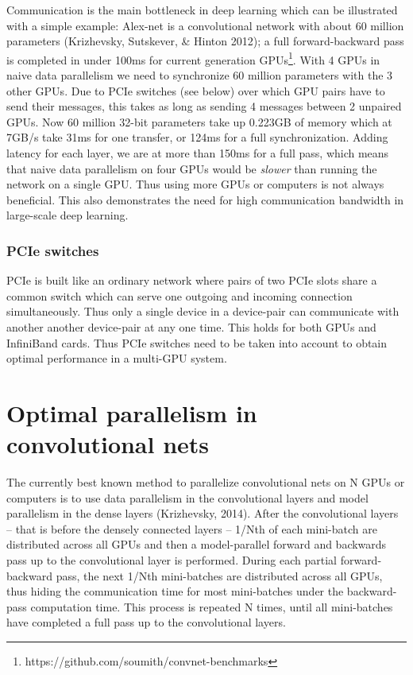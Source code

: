\documentclass{article} %
\begin{document}
Communication is the main bottleneck in deep learning which can be illustrated with a simple example: Alex-net is a convolutional network with about 60 million parameters (Krizhevsky, Sutskever, \& Hinton 2012); a full forward-backward pass is completed in under 100ms for current generation GPUs\footnote{https://github.com/soumith/convnet-benchmarks}. With 4 GPUs in naive data parallelism we need to synchronize 60 million parameters with the 3 other GPUs. Due to PCIe switches (see below) over which GPU pairs have to send their messages, this takes as long as sending 4 messages between 2 unpaired GPUs. Now 60 million 32-bit parameters take up 0.223GB of memory which at 7GB/s take 31ms for one transfer, or 124ms for a full synchronization. Adding latency for each layer, we are at more than 150ms for a full pass, which means that naive data parallelism on four GPUs would be {\it slower} than running the network on a single GPU. Thus using more GPUs or computers is not always beneficial. This also demonstrates the need for high communication bandwidth in large-scale deep learning.

\subsubsection{PCIe switches}

PCIe is built like an ordinary network where pairs of two PCIe slots share a common switch which can serve one outgoing and incoming connection simultaneously. Thus only a single device in a device-pair can communicate with another another device-pair at any one time. This holds for both GPUs and InfiniBand cards. Thus PCIe switches need to be taken into account to obtain optimal performance in a multi-GPU system.

\section{Optimal parallelism in convolutional nets}

The currently best known method to parallelize convolutional nets on N GPUs or computers is to use data parallelism in the convolutional layers and model parallelism in the dense layers (Krizhevsky, 2014). After the convolutional layers -- that is before the densely connected layers -- 1/Nth of each mini-batch are distributed across all GPUs and then a model-parallel forward and backwards pass up to the convolutional layer is performed. During each partial forward-backward pass, the next 1/Nth mini-batches are distributed across all GPUs, thus hiding the communication time for most mini-batches under the backward-pass computation time. This process is repeated N times, until all mini-batches have completed a full pass up to the convolutional layers. 
\end{document}
